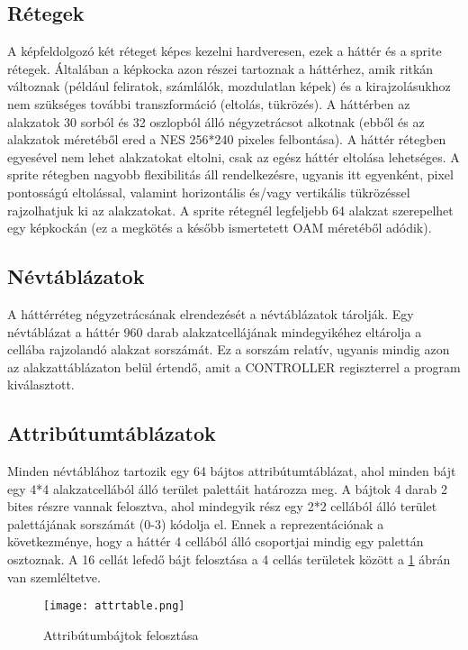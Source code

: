 \subsection{Rétegek}
A képfeldolgozó két réteget képes kezelni hardveresen, ezek a háttér és a sprite rétegek.
Általában a képkocka azon részei tartoznak a háttérhez, amik ritkán változnak (például feliratok, számlálók, mozdulatlan képek) és a kirajzolásukhoz nem szükséges további transzformáció (eltolás, tükrözés). A háttérben az alakzatok 30 sorból és 32 oszlopból álló négyzetrácsot alkotnak (ebből és az alakzatok méretéből ered a NES 256*240 pixeles felbontása).
A háttér rétegben egyesével nem lehet alakzatokat eltolni, csak az egész háttér eltolása lehetséges. A sprite rétegben nagyobb flexibilitás áll rendelkezésre, ugyanis itt egyenként, pixel pontosságú eltolással, valamint horizontális és/vagy vertikális tükrözéssel rajzolhatjuk ki az alakzatokat. A sprite rétegnél legfeljebb 64 alakzat szerepelhet egy képkockán (ez a megkötés a később ismertetett OAM méretéből adódik).  

\subsection{Névtáblázatok}

A háttérréteg négyzetrácsának elrendezését a névtáblázatok tárolják. Egy névtáblázat a háttér 960 darab alakzatcellájának mindegyikéhez eltárolja a cellába rajzolandó alakzat sorszámát. Ez a sorszám relatív, ugyanis mindig azon az alakzattáblázaton belül értendő, amit a CONTROLLER regiszterrel a program kiválasztott.

\subsection{Attribútumtáblázatok}

Minden névtáblához tartozik egy 64 bájtos attribútumtáblázat, ahol minden bájt egy 4*4 alakzatcellából álló terület palettáit határozza meg. A bájtok 4 darab 2 bites részre vannak felosztva, ahol mindegyik rész egy 2*2 cellából álló terület palettájának sorszámát (0-3) kódolja el. Ennek a reprezentációnak a következménye, hogy a háttér 4 cellából álló csoportjai mindig egy palettán osztoznak. A 16 cellát lefedő bájt felosztása a 4 cellás területek között a \ref{fig:attr} ábrán van szemléltetve.

\begin{figure}[H]
	\centering
	\texttt{[image: attrtable.png]}
	\caption{Attribútumbájtok felosztása}
	\label{fig:attr}
\end{figure}

